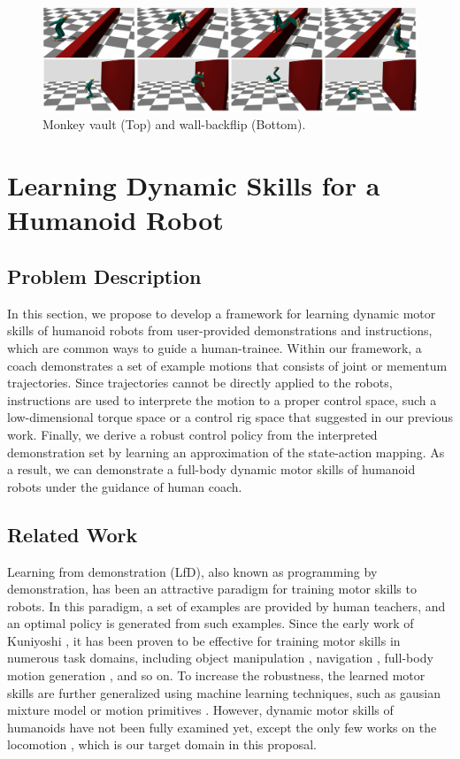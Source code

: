 \begin{figure}[htbp]
\center
  \includegraphics[width=\linewidth]{images/training1_teaser}
  \caption{Monkey vault (Top) and wall-backflip (Bottom).}
 \label{fig:training1_teaser}
\end{figure}


\section{Learning Dynamic Skills for a Humanoid Robot}

\subsection{Problem Description}

In this section, we propose to develop a framework for learning
dynamic motor skills of humanoid robots from user-provided demonstrations 
and instructions, which are common ways to guide a human-trainee.
Within our framework, a coach demonstrates a set of example motions
that consists of joint or mementum trajectories. 
Since trajectories cannot be directly applied to the robots,
instructions are used to interprete the motion to a proper
control space, such a low-dimensional torque space or a control rig 
space \cite{Ha:2014:ITD} that suggested in our previous work.
Finally, we derive a robust control policy from the interpreted
demonstration set by learning an approximation of the state-action mapping.
As a result, we can demonstrate a full-body dynamic motor skills
of humanoid robots under the guidance of human coach.

\subsection{Related Work}

Learning from demonstration (LfD), also known as programming by demonstration,
has been an attractive paradigm for training motor skills to robots.
In this paradigm, a set of examples are provided by human teachers,
and an optimal policy is generated from such examples.
Since the early work of Kuniyoshi \etal \cite{kuniyoshi:1989:TBS},
it has been proven to be effective for training motor skills in
numerous task domains, including object manipulation 
\cite{Atkeson:1997:RLD,Calinon:2007:LRG,Ueda:2010:MNH},
navigation \cite{Konidaris:2011:RLD}, 
full-body motion generation \cite{Kulic:2011:ILF}, and so on.
To increase the robustness, the learned motor skills are further 
generalized using machine learning techniques,
such as gausian mixture model \cite{Calinon:2007:LRG} or
motion primitives \cite{Pastor:2009:LGM}.
However, dynamic motor skills of humanoids have
not been fully examined yet, except the only few works on the
locomotion \cite{Nakanishi:2004:LDA}, which is our target domain
in this proposal.

